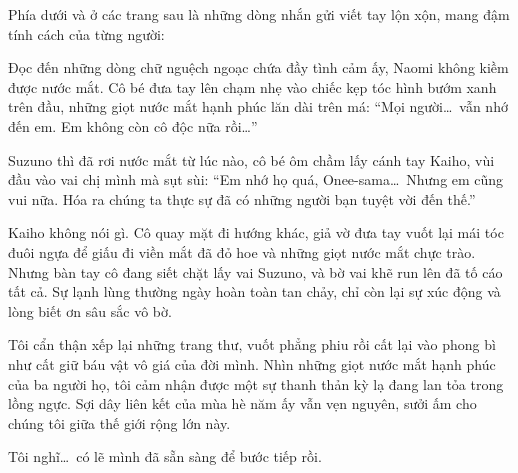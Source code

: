 \documentclass[../main.tex]{subfiles}
\begin{document}
Phía dưới và ở các trang sau là những dòng nhắn gửi viết tay lộn xộn, mang đậm tính cách của từng người:







Đọc đến những dòng chữ nguệch ngoạc chứa đầy tình cảm ấy, Naomi không kiềm được nước mắt. Cô bé đưa tay lên chạm nhẹ vào chiếc kẹp tóc hình bướm xanh trên đầu, những giọt nước mắt hạnh phúc lăn dài trên má: ``Mọi người\dots\ vẫn nhớ đến em. Em không còn cô độc nữa rồi\dots''

Suzuno thì đã rơi nước mắt từ lúc nào, cô bé ôm chầm lấy cánh tay Kaiho, vùi đầu vào vai chị mình mà sụt sùi: ``Em nhớ họ quá, Onee-sama\dots\ Nhưng em cũng vui nữa. Hóa ra chúng ta thực sự đã có những người bạn tuyệt vời đến thế.''

Kaiho không nói gì. Cô quay mặt đi hướng khác, giả vờ đưa tay vuốt lại mái tóc đuôi ngựa để giấu đi viền mắt đã đỏ hoe và những giọt nước mắt chực trào. Nhưng bàn tay cô đang siết chặt lấy vai Suzuno, và bờ vai khẽ run lên đã tố cáo tất cả. Sự lạnh lùng thường ngày hoàn toàn tan chảy, chỉ còn lại sự xúc động và lòng biết ơn sâu sắc vô bờ.

Tôi cẩn thận xếp lại những trang thư, vuốt phẳng phiu rồi cất lại vào phong bì như cất giữ báu vật vô giá của đời mình. Nhìn những giọt nước mắt hạnh phúc của ba người họ, tôi cảm nhận được một sự thanh thản kỳ lạ đang lan tỏa trong lồng ngực. Sợi dây liên kết của mùa hè năm ấy vẫn vẹn nguyên, sưởi ấm cho chúng tôi giữa thế giới rộng lớn này.

Tôi nghĩ\dots\ có lẽ mình đã sẵn sàng để bước tiếp rồi.
\end{document}
